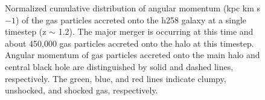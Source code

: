 \documentclass[]{emulateapj}
\begin{document}
\begin{figure}
\centerline{}
\caption[]{ Normalized cumulative distribution of angular momentum (kpc km s${{-1}}$) of the gas particles accreted onto the h258 galaxy at a single timestep (z $\sim$ 1.2). The major merger is occurring at this time and about 450,000 gas particles accreted onto the halo at this timestep. Angular momentum of gas particles accreted onto the main halo and central black hole are distinguished by solid and dashed lines, respectively. The green, blue, and red lines indicate clumpy, unshocked, and shocked gas, respectively.}
\label{hrh258angmom_merger2} 
\end{figure}
\end{document}
